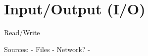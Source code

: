 
\section{Input/Output (I/O)}
\label{sec:inputoutput-io}

Read/Write

Sources:
  - Files
  - Network?
  - 





%
